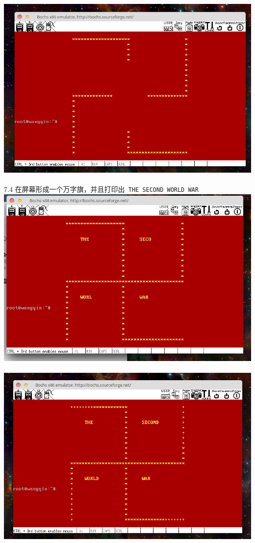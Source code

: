 \documentclass[a4paper]{article}
\begin{document}
{{\center\includegraphics[scale=0.45]{Illustrations/process_start2.png}}\\\\
7.4 在屏幕形成一个万字旗，并且打印出\verb| THE SECOND WORLD WAR| 
{\center\includegraphics[scale=0.45]{Illustrations/process_start3.png}}\\\\
{\center\includegraphics[scale=0.45]{Illustrations/process_start5.png}}\\\\
}
\end{document}
